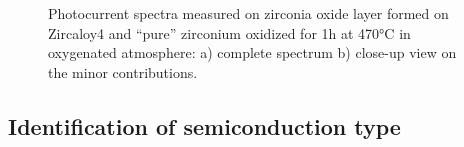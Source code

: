 \begin{figure}[h]
\begin{subfigure}{\coef\textwidth}
            \caption{}
            \label{fig:benaboud_minor_oxides_b}
        \end{subfigure}
        
        \caption{Photocurrent spectra measured on zirconia oxide layer formed on 
        Zircaloy4 and “pure” zirconium oxidized for 1h at 470°C in oxygenated 
        atmosphere\citep{benaboud2007}: a) complete spectrum b) close-up view on the minor contributions.}
        \label{fig:benaboud_minor_oxides}
    \end{figure}



\subsection{Identification of semiconduction type}

